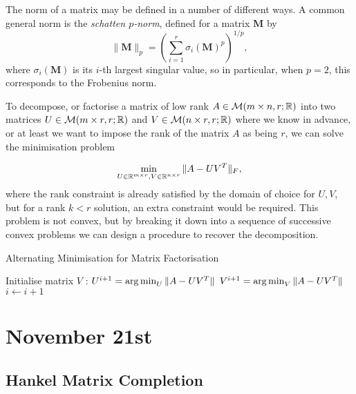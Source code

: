 \documentclass[12pt]{article}
\begin{document}
\cite{MekaJainDhillon}

\begin{remark}
    The norm of a matrix may be defined in a number of different ways. A common general norm is the \emph{schatten $p$-norm}, defined for a matrix $\mathbf{M}$ by 
    \begin{equation*}
        \lVert \mathbf{M}\rVert_p = \left(\sum_{i=1}^{r}{\sigma_i(\mathbf{M})^p}\right)^{1/p},
    \end{equation*}
    where $\sigma_i(\mathbf{M})$ is its $i$-th largest singular value, so in particular, when $p=2$, this corresponds to the Frobenius norm.
\end{remark}

To decompose, or factorise a matrix of low rank $A\in\mathcal{M}(m\times n, r;\mathbb{R})$ into two matrices $U \in \mathcal{M}(m\times r, r;\mathbb{R})$ and $ V\in \mathcal{M}(n\times r, r;\mathbb{R})$ where we know in advance, or at least we want to impose the rank of the matrix $A$ as being $r$, we can solve the minimisation problem

\begin{equation}
    \min_{U\in\mathbb{R}^{m\times r},V\in\mathbb{R}^{n\times r}}{\lVert A-UV^T\rVert_F},
\end{equation}
where the rank constraint is already satisfied by the domain of choice for $U,V$, but for a rank $k<r$ solution, an extra constraint would be required. This problem is not convex, but by breaking it down into a sequence of successive convex problems we can design a procedure to recover the decomposition.

\begin{algorithm}
    \caption{Alternating Minimisation for Matrix Factorisation \label{alternating_optimisation}}
    \begin{algorithmic}[1]
        
        \State Initialise matrix $V$
         :
            \State $U^{i+1} = \operatorname*{arg\,min}_{U}{\lVert A - UV^T\rVert}$
            \State $V^{i+1} = \operatorname*{arg\,min}_{V}{\lVert A - UV^T\rVert}$
            \State $i \leftarrow i + 1$
        \EndWhile
    \end{algorithmic}
\end{algorithm}

\section{November 21st}

\subsection{Hankel Matrix Completion}
\end{document}
